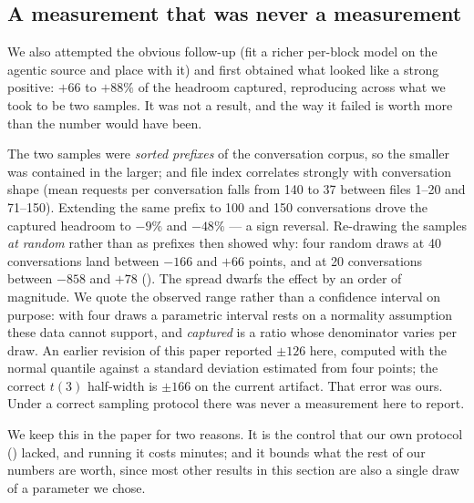\subsection{A measurement that was never a measurement}
\label{sec:sampling}
We also attempted the obvious follow-up (fit a richer per-block model on the agentic source and place
with it) and first obtained what looked like a strong positive: $+66$ to $+88\%$ of the headroom
captured, reproducing across what we took to be two samples. It was not a result, and the way it failed is
worth more than the number would have been.

The two samples were \emph{sorted prefixes} of the conversation corpus, so the smaller was contained in
the larger; and file index correlates strongly with conversation shape (mean requests per conversation
falls from 140 to 37 between files 1--20 and 71--150). Extending the same prefix to 100 and 150
conversations drove the captured headroom to $-9\%$ and $-48\%$ --- a sign reversal. Re-drawing the
samples \emph{at random} rather than as prefixes then showed why: four random draws at 40
conversations land between $-166$ and $+66$ points, and at 20 conversations between $-858$ and $+78$
(). The spread dwarfs the effect by an order of magnitude. We quote the observed range
rather than a confidence interval on purpose: with four draws a parametric interval rests on a normality
assumption these data cannot support, and \emph{captured} is a ratio whose denominator varies per draw.
An earlier revision of this paper reported $\pm126$ here, computed with the normal quantile against a
standard deviation estimated from four points; the correct $t(3)$ half-width is $\pm166$ on the current
artifact. That error was ours. Under a correct sampling protocol there was never a
measurement here to report.

We keep this in the paper for two reasons. It is the control that our own protocol
() lacked, and running it costs minutes; and it bounds what the rest of our numbers
are worth, since most other results in this section are also a single draw of a parameter we chose.


